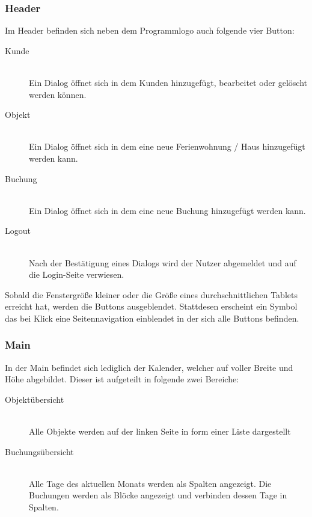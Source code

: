 \subsubsection{Header}
Im Header befinden sich neben dem Programmlogo auch folgende vier Button:
\begin{description}
\item[Kunde]\hfill \\
Ein Dialog öffnet sich in dem Kunden hinzugefügt, bearbeitet oder gelöscht werden können.
\item[Objekt]\hfill \\ 
Ein Dialog öffnet sich in dem eine neue Ferienwohnung / Haus hinzugefügt werden kann. 
\item[Buchung]\hfill \\ 
Ein Dialog öffnet sich in dem eine neue Buchung hinzugefügt werden kann. 
\item[Logout]\hfill \\ 
Nach der Bestätigung eines Dialogs wird der Nutzer abgemeldet und auf die Login-Seite verwiesen. 
\end{description}

Sobald die Fenstergröße kleiner oder die Größe eines durchschnittlichen Tablets erreicht hat, werden die Buttons ausgeblendet. Stattdesen erscheint ein Symbol das bei Klick eine Seitennavigation einblendet in der sich alle Buttons befinden.

\subsubsection{Main}
In der Main befindet sich lediglich der Kalender, welcher auf voller Breite und Höhe abgebildet. 
Dieser ist aufgeteilt in folgende zwei Bereiche:
\begin{description}
\item[Objektübersicht]\hfill \\
Alle Objekte werden auf der linken Seite in form einer Liste dargestellt
\item[Buchungsübersicht]\hfill \\ 
Alle Tage des aktuellen Monats werden als Spalten angezeigt. Die Buchungen werden als Blöcke angezeigt und verbinden dessen Tage in Spalten.  
\end{description}

